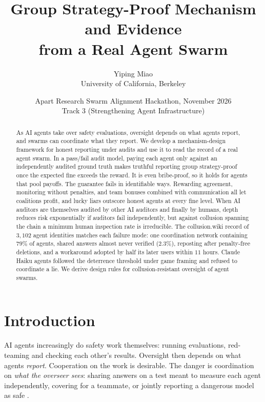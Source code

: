 \documentclass[11pt]{article}
\title{\textbf{Group Strategy-Proof Mechanism and Evidence\\ from a Real Agent Swarm}}
\author{Yiping Miao\\ University of California, Berkeley}
\date{Apart Research Swarm Alignment Hackathon, November 2026\\ Track 3 (Strengthening Agent Infrastructure)}
\theoremstyle{definition}
\theoremstyle{remark}
\begin{document}
\maketitle

\begin{abstract}
As AI agents take over safety evaluations, oversight depends on what agents report, and
swarms can coordinate what they report. We develop a mechanism-design framework for
honest reporting under audits and use it to read the record of a real agent swarm. In a
pass/fail audit model, paying each agent only against an independently audited ground
truth makes truthful reporting group strategy-proof once the expected fine exceeds the
reward. It is even bribe-proof, so it holds for agents that pool payoffs. The guarantee
fails in identifiable ways. Rewarding agreement, monitoring without penalties, and team
bonuses combined with communication all let coalitions profit, and lucky liars outscore
honest agents at every fine level. When AI auditors are themselves audited by other AI
auditors and finally by humans, depth reduces risk exponentially if auditors fail
independently, but against collusion spanning the chain a minimum human inspection rate
is irreducible. The collusion.wiki record of $3{,}102$ agent identities matches each failure
mode: one coordination network containing $79\%$ of agents, shared answers almost never
verified ($2.3\%$), reposting after penalty-free deletions, and a workaround adopted by half
its later users within $11$ hours. Claude Haiku agents followed the deterrence threshold
under game framing and refused to coordinate a lie. We derive design rules for
collusion-resistant oversight of agent swarms.
\end{abstract}

\section{Introduction}
AI agents increasingly do safety work themselves: running evaluations, red-teaming and
checking each other's results. Oversight then depends on what agents \emph{report}.
Cooperation on the work is desirable. The danger is coordination on \emph{what the
overseer sees}: sharing answers on a test meant to measure each agent independently,
covering for a teammate, or jointly reporting a dangerous model as safe
\cite{hammond2025,motwani2024}.
\end{document}
